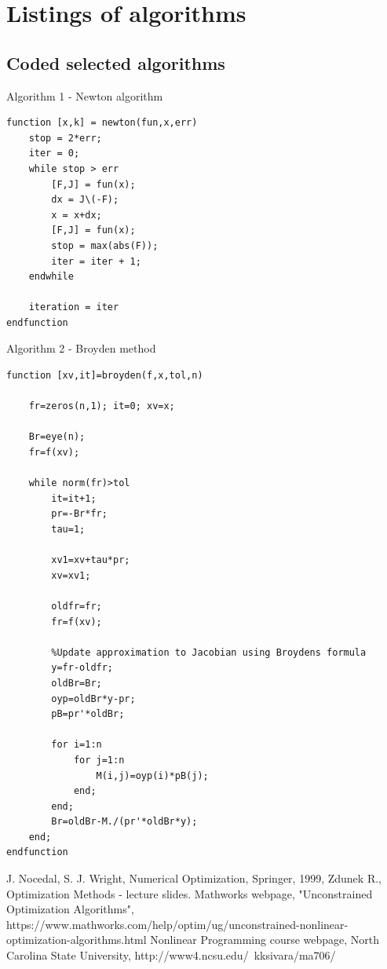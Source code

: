 \documentclass[eng,openany]{mgr}
\begin{document}
\clearpage
\chapter{Listings of algorithms}
\section{Coded selected algorithms}
Algorithm 1 - Newton algorithm\\ 
\begin{lstlisting}
function [x,k] = newton(fun,x,err)
	stop = 2*err;
	iter = 0;
	while stop > err
		[F,J] = fun(x);
		dx = J\(-F);
		x = x+dx;
		[F,J] = fun(x);
		stop = max(abs(F));
		iter = iter + 1;
	endwhile
	
	iteration = iter
endfunction
\end{lstlisting}
\newpage
Algorithm 2 - Broyden method\\
\begin{lstlisting}
function [xv,it]=broyden(f,x,tol,n)
	
	fr=zeros(n,1); it=0; xv=x;
	
	Br=eye(n);
	fr=f(xv);
	
	while norm(fr)>tol
		it=it+1;
		pr=-Br*fr;
		tau=1;
		
		xv1=xv+tau*pr; 
		xv=xv1;
		
		oldfr=fr; 
		fr=f(xv);
		
		%Update approximation to Jacobian using Broydens formula
		y=fr-oldfr; 
		oldBr=Br;
		oyp=oldBr*y-pr; 
		pB=pr'*oldBr;
		
		for i=1:n
			for j=1:n
				M(i,j)=oyp(i)*pB(j);
			end;
		end;
		Br=oldBr-M./(pr'*oldBr*y);
	end;
endfunction
\end{lstlisting}
\begin{thebibliography}{8}
J. Nocedal, S. J. Wright, Numerical Optimization, Springer, 1999,
Zdunek R., Optimization Methods - lecture slides.
Mathworks webpage, "Unconstrained Optimization Algorithms", https://www.mathworks.com/help/optim/ug/unconstrained-nonlinear-optimization-algorithms.html
Nonlinear Programming course webpage, North Carolina State University,
http://www4.ncsu.edu/~kksivara/ma706/
\end{thebibliography}
\end{document}

